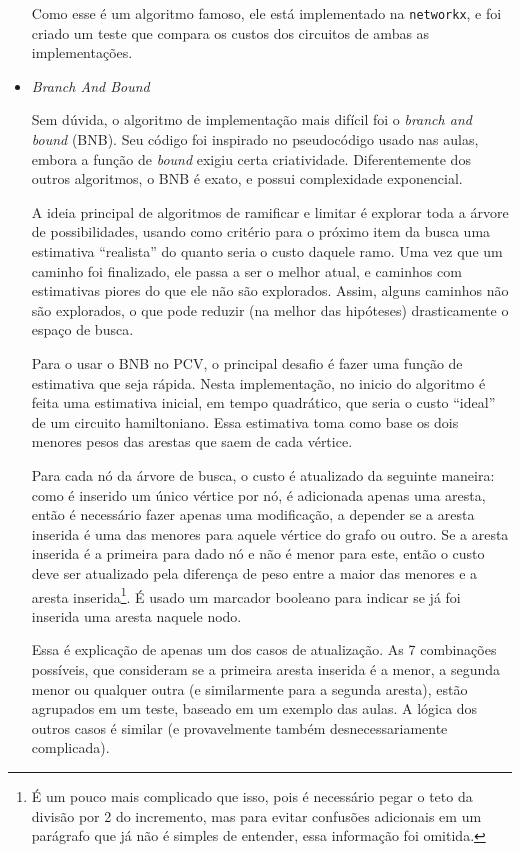 \documentclass{article}
\begin{document}
\begin{itemize}
	      Como esse é um algoritmo famoso, ele está implementado na \texttt{networkx}, e foi criado um teste que compara os custos dos circuitos de ambas as implementações.

	\item \textit{Branch And Bound}

	      Sem dúvida, o algoritmo de implementação mais difícil foi o \textit{branch and bound} (BNB). Seu código foi inspirado no pseudocódigo usado nas aulas, embora a função de \textit{bound} exigiu certa criatividade. Diferentemente dos outros algoritmos, o BNB é exato, e possui complexidade exponencial.

	      A ideia principal de algoritmos de ramificar e limitar é explorar toda a árvore de possibilidades, usando como critério para o próximo item da busca uma estimativa ``realista'' do quanto seria o custo daquele ramo. Uma vez que um caminho foi finalizado, ele passa a ser o melhor atual, e caminhos com estimativas piores do que ele não são explorados. Assim, alguns caminhos não são explorados, o que pode reduzir (na melhor das hipóteses) drasticamente o espaço de busca.

	      Para o usar o BNB no PCV, o principal desafio é fazer uma função de estimativa que seja rápida. Nesta implementação, no inicio do algoritmo é feita uma estimativa inicial, em tempo quadrático, que seria o custo ``ideal'' de um circuito hamiltoniano. Essa estimativa toma como base os dois menores pesos das arestas que saem de cada vértice.

	      Para cada nó da árvore de busca, o custo é atualizado da seguinte maneira: como é inserido um único vértice por nó, é adicionada apenas uma aresta, então é necessário fazer apenas uma modificação, a depender se a aresta inserida é uma das menores para aquele vértice do grafo ou outro. Se a aresta inserida é a primeira para dado nó e não é menor para este, então o custo deve ser atualizado pela diferença de peso entre a maior das menores e a aresta inserida\footnote{É um pouco mais complicado que isso, pois é necessário pegar o teto da divisão por 2 do incremento, mas para evitar confusões adicionais em um parágrafo que já não é simples de entender, essa informação foi omitida.}. É usado um marcador booleano para indicar se já foi inserida uma aresta naquele nodo.

	      Essa é explicação de apenas um dos casos de atualização. As 7 combinações possíveis, que consideram se a primeira aresta inserida é a menor, a segunda menor ou qualquer outra (e similarmente para a segunda aresta), estão agrupados em um teste, baseado em um exemplo das aulas. A lógica dos outros casos é similar (e provavelmente também desnecessariamente complicada).


\end{itemize}
\end{document}
